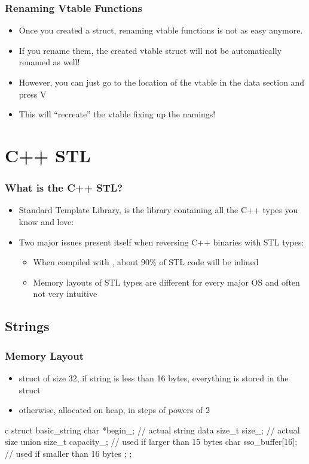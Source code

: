 \documentclass[aspectratio=169]{beamer}
\begin{document}
\begin{frame}
    \frametitle{Renaming Vtable Functions}
    \begin{itemize}
        \item Once you created a struct, renaming vtable functions is not as easy anymore.
        \item If you rename them, the created vtable struct will not be automatically renamed as well!
        \item However, you can just go to the location of the vtable in the data section and press V
        \item This will ``recreate'' the vtable fixing up the namings!
    \end{itemize}
\end{frame}

{
\showsubsectionframe

\section{C++ STL}
\begin{frame}[fragile]
	\frametitle{What is the C++ STL?}
	\begin{itemize}
		\item Standard Template Library, is the library containing all the C++ types you know and love: 
		\item Two major issues present itself when reversing C++ binaries with STL types:
		\begin{itemize}
			\item When compiled with , about 90\% of STL code will be inlined
			\item Memory layouts of STL types are different for every major OS and often not very intuitive
		\end{itemize}
	\end{itemize}
\end{frame}

\subsection{Strings}
\begin{frame}[fragile]
    \frametitle{Memory Layout}
    \begin{itemize}
        \item struct of size 32, if string is less than 16 bytes, everything is stored in the struct
        \item otherwise, allocated on heap, in steps of powers of 2
    \end{itemize}
\begin{codebox}{c}
struct basic_string
{
    char *begin_; // actual string data
    size_t size_; // actual size
    union
    {
        size_t capacity_; // used if larger than 15 bytes
        char sso_buffer[16]; // used if smaller than 16 bytes
    };
};	
\end{codebox}
\end{frame}

}
\end{document}
